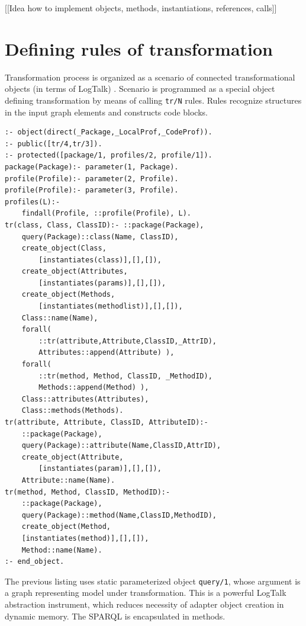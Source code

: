 \documentclass[12pt,a4paper]{llncs}
\begin{document}


[[Idea how to implement objects, methods, instantiations, references, calls]]

\section{Defining rules of transformation}
\label{sec:mda-rules}

Transformation process is organized as a scenario of connected transformational objects (in terms of LogTalk) \cite{tereh1}.  Scenario is programmed as a special object defining transformation by means of calling \verb|tr/N| rules.  Rules recognize structures in the input graph elements and constructs code blocks.

\begin{multicols}{2}
\begin{verbatim}
:- object(direct(_Package,_LocalProf,_CodeProf)).
:- public([tr/4,tr/3]).
:- protected([package/1, profiles/2, profile/1]).
package(Package):- parameter(1, Package).
profile(Profile):- parameter(2, Profile).
profile(Profile):- parameter(3, Profile).
profiles(L):-
    findall(Profile, ::profile(Profile), L).
tr(class, Class, ClassID):- ::package(Package),
    query(Package)::class(Name, ClassID),
    create_object(Class,
        [instantiates(class)],[],[]),
    create_object(Attributes,
        [instantiates(params)],[],[]),
    create_object(Methods,
        [instantiates(methodlist)],[],[]),
    Class::name(Name),
    forall(
        ::tr(attribute,Attribute,ClassID,_AttrID),
        Attributes::append(Attribute) ),
    forall(
        ::tr(method, Method, ClassID, _MethodID),
        Methods::append(Method) ),
    Class::attributes(Attributes),
    Class::methods(Methods).
tr(attribute, Attribute, ClassID, AttributeID):-
    ::package(Package),
    query(Package)::attribute(Name,ClassID,AttrID),
    create_object(Attribute,
        [instantiates(param)],[],[]),
    Attribute::name(Name).
tr(method, Method, ClassID, MethodID):-
    ::package(Package),
    query(Package)::method(Name,ClassID,MethodID),
    create_object(Method,
    [instantiates(method)],[],[]),
    Method::name(Name).
:- end_object.
\end{verbatim}
\end{multicols}

The previous listing uses static parameterized object \verb|query/1|, whose argument is a graph representing model under transformation.  This is a powerful LogTalk abstraction instrument, which reduces necessity of adapter object creation in dynamic memory.  The SPARQL is encapsulated in methods.
\end{document}
